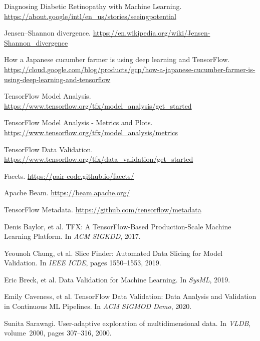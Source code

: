 \documentclass[11pt]{article}
\begin{document}
\begin{thebibliography}{10}
\itemsep=1pt

\newblock Diagnosing Diabetic Retinopathy with Machine Learning.
\newblock
  \url{https://about.google/intl/en\_us/stories/seeingpotential}

\newblock Jensen–Shannon divergence.
\newblock
  \url{https://en.wikipedia.org/wiki/Jensen-Shannon\_divergence}
  
\newblock How a Japanese cucumber farmer is using deep learning and TensorFlow.
\newblock
  \url{https://cloud.google.com/blog/products/gcp/how-a-japanese-cucumber-farmer-is-using-deep-learning-and-tensorflow}

\newblock TensorFlow Model Analysis.
\newblock
  \url{https://www.tensorflow.org/tfx/model\_analysis/get\_started}

\newblock TensorFlow Model Analysis - Metrics and Plots.
\newblock
  \url{https://www.tensorflow.org/tfx/model\_analysis/metrics}

\newblock TensorFlow Data Validation.
\newblock
  \url{https://www.tensorflow.org/tfx/data\_validation/get\_started}

\newblock Facets.
\newblock
  \url{https://pair-code.github.io/facets/}

\newblock Apache Beam.
\newblock
  \url{https://beam.apache.org/}

\newblock TensorFlow Metadata.
\newblock
  \url{https://github.com/tensorflow/metadata}

Denis Baylor, et al.
\newblock TFX: A TensorFlow-Based Production-Scale Machine Learning Platform.
\newblock In {\em ACM SIGKDD}, 2017.

 Yeounoh Chung, et al.
\newblock Slice Finder: Automated Data Slicing for Model Validation.
\newblock In {\em IEEE ICDE}, pages 1550--1553, 2019.

Eric Breck, et al.
\newblock Data Validation for Machine Learning.
\newblock In {\em SysML}, 2019.

Emily Caveness, et al.
\newblock TensorFlow Data Validation: Data Analysis and Validation in Continuous ML Pipelines.
\newblock In {\em ACM SIGMOD Demo}, 2020.

Sunita Sarawagi.
\newblock User-adaptive exploration of multidimensional data.
\newblock In {\em VLDB}, volume~2000, pages 307--316, 2000.


\end{thebibliography}
\end{document}

